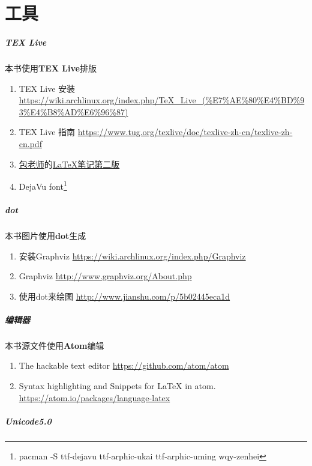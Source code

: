 \chapter{工具}

\paragraph{TEX Live}
本书使用\textbf{TEX Live}排版
\begin{enumerate}
  \item TEX Live 安装 \url{https://wiki.archlinux.org/index.php/TeX_Live_(%E7%AE%80%E4%BD%93%E4%B8%AD%E6%96%87)}
  \item TEX Live 指南 \url{https://www.tug.org/texlive/doc/texlive-zh-cn/texlive-zh-cn.pdf}
  \item \href{http://www.dralpha.com/zh/index.htm}{包老师}的\href{http://dralpha.altervista.org/zh/tech/lnotes2.pdf}{LaTeX笔记第二版}
  \item DejaVu font\footnote{pacman -S ttf-dejavu ttf-arphic-ukai ttf-arphic-uming wqy-zenhei}
\end{enumerate}

\paragraph{dot}
本书图片使用\textbf{dot}生成
\begin{enumerate}
  \item 安装Graphviz \url{https://wiki.archlinux.org/index.php/Graphviz}
  \item Graphviz \url{http://www.graphviz.org/About.php}
  \item 使用dot来绘图 \url{http://www.jianshu.com/p/5b02445eca1d}
\end{enumerate}

\paragraph{编辑器}
本书源文件使用\textbf{Atom}编辑
\begin{enumerate}
  \item The hackable text editor \url{https://github.com/atom/atom}
  \item Syntax highlighting and Snippets for LaTeX in atom. \url{https://atom.io/packages/language-latex}
\end{enumerate}

\paragraph{Unicode5.0}

